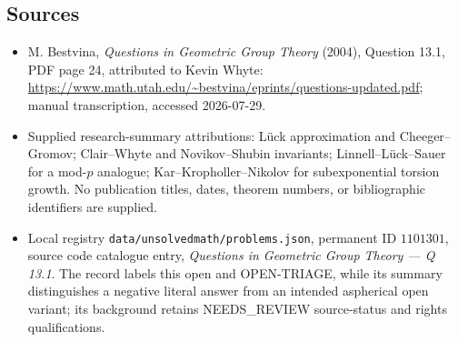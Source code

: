 \documentclass[11pt]{article}
\begin{document}
\subsection{Sources}
\begin{itemize}
\item M. Bestvina, \emph{Questions in Geometric Group Theory} (2004), Question 13.1, PDF page 24, attributed to Kevin Whyte: \url{https://www.math.utah.edu/~bestvina/eprints/questions-updated.pdf}; manual transcription, accessed 2026-07-29.
\item Supplied research-summary attributions: L\"uck approximation and Cheeger--Gromov; Clair--Whyte and Novikov--Shubin invariants; Linnell--L\"uck--Sauer for a mod-$p$ analogue; Kar--Kropholler--Nikolov for subexponential torsion growth. No publication titles, dates, theorem numbers, or bibliographic identifiers are supplied.
\item Local registry \texttt{data/unsolvedmath/problems.json}, permanent ID $1101301$, source code catalogue entry, \emph{Questions in Geometric Group Theory --- Q 13.1}. The record labels this open and OPEN-TRIAGE, while its summary distinguishes a negative literal answer from an intended aspherical open variant; its background retains NEEDS\_REVIEW source-status and rights qualifications.
\end{itemize}
\end{document}
